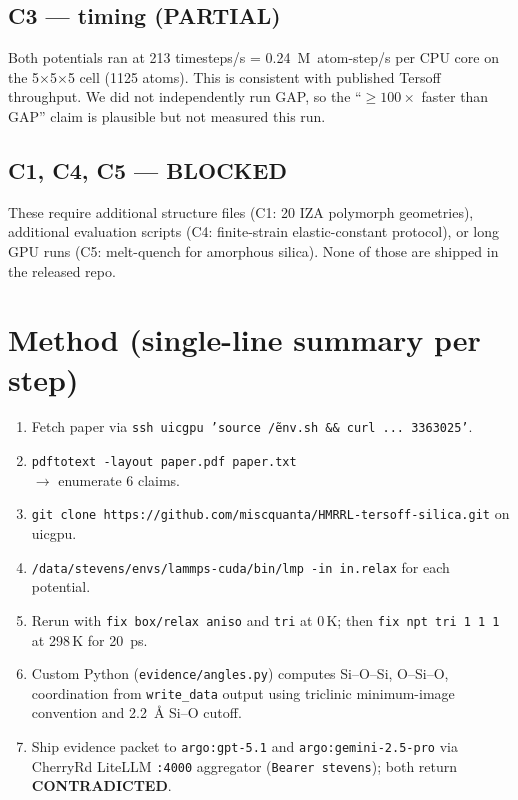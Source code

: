 \documentclass[11pt]{article}
\newcommand{\PARTIAL}[0]{{\color{orange!80!black}\textbf{PARTIAL}}}
\newcommand{\BLOCKED}[0]{{\color{gray}\textbf{BLOCKED}}}
\begin{document}
\subsection{C3 --- timing (\PARTIAL)}
Both potentials ran at 213 timesteps/s = 0.24~M~atom-step/s per CPU core on the 5$\times$5$\times$5 cell (1125 atoms). This is consistent with published Tersoff throughput. We did not independently run GAP, so the ``$\ge 100\times$ faster than GAP'' claim is plausible but not measured this run.

\subsection{C1, C4, C5 --- \BLOCKED}
These require additional structure files (C1: 20 IZA polymorph geometries), additional evaluation scripts (C4: finite-strain elastic-constant protocol), or long GPU runs (C5: melt-quench for amorphous silica). None of those are shipped in the released repo.

\section{Method (single-line summary per step)}
\begin{enumerate}
\item Fetch paper via \texttt{ssh uicgpu 'source \~/env.sh \&\& curl ... 3363025'}.
\item \texttt{pdftotext -layout paper.pdf paper.txt} \\ $\to$ enumerate 6 claims.
\item \texttt{git clone https://github.com/miscquanta/HMRRL-tersoff-silica.git} on uicgpu.
\item \texttt{/data/stevens/envs/lammps-cuda/bin/lmp -in in.relax} for each potential.
\item Rerun with \texttt{fix box/relax aniso} and \texttt{tri} at 0\,K; then \texttt{fix npt tri 1 1 1} at 298\,K for 20~ps.
\item Custom Python (\texttt{evidence/angles.py}) computes Si--O--Si, O--Si--O, coordination from \texttt{write\_data} output using triclinic minimum-image convention and 2.2~\AA{} Si--O cutoff.
\item Ship evidence packet to \texttt{argo:gpt-5.1} and \texttt{argo:gemini-2.5-pro} via CherryRd LiteLLM \texttt{:4000} aggregator (\texttt{Bearer stevens}); both return \textbf{CONTRADICTED}.
\end{enumerate}
\end{document}

